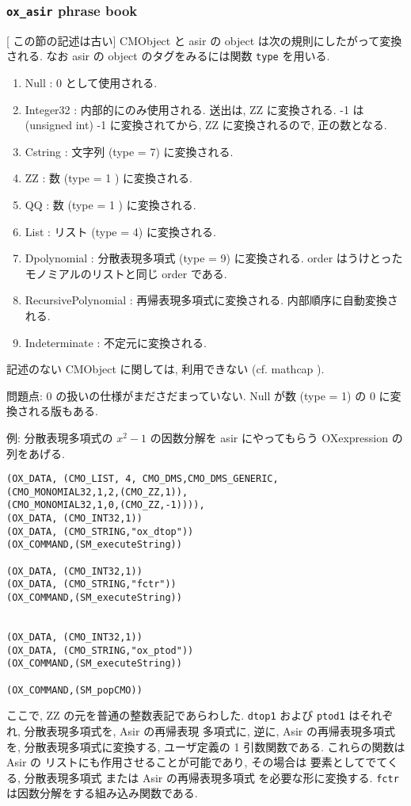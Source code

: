 \subsubsection{ {\tt ox\_asir} phrase book}

[ この節の記述は古い]
CMObject と asir の object は次の規則にしたがって変換される.
なお asir の object のタグをみるには関数 {\tt type} を用いる.
\begin{enumerate}
\item Null :  0 として使用される.
\item Integer32 : 内部的にのみ使用される. 送出は, ZZ に変換される.
  -1 は (unsigned int) -1 に変換されてから, ZZ に変換されるので,
  正の数となる.
\item Cstring : 文字列 (type = 7) に変換される.
\item ZZ : 数 (type = 1 ) に変換される.
\item QQ : 数 (type = 1 ) に変換される.
\item List : リスト (type = 4) に変換される.
\item Dpolynomial : 分散表現多項式 (type = 9) に変換される.
order はうけとったモノミアルのリストと同じ order である.
\item RecursivePolynomial : 再帰表現多項式に変換される.
内部順序に自動変換される.
\item Indeterminate : 不定元に変換される.
\end{enumerate}
記述のない CMObject に関しては, 利用できない (cf. mathcap ).

\noindent
問題点: 0 の扱いの仕様がまださだまっていない.
Null が数 (type = 1) の 0 に変換される版もある.

\medbreak
\noindent
例: 
分散表現多項式の $x^2-1$ の因数分解を asir にやってもらう 
OXexpression の列をあげる.
{\footnotesize
\begin{verbatim}
(OX_DATA, (CMO_LIST, 4, CMO_DMS,CMO_DMS_GENERIC,
(CMO_MONOMIAL32,1,2,(CMO_ZZ,1)),
(CMO_MONOMIAL32,1,0,(CMO_ZZ,-1)))),
(OX_DATA, (CMO_INT32,1))
(OX_DATA, (CMO_STRING,"ox_dtop"))
(OX_COMMAND,(SM_executeString))

(OX_DATA, (CMO_INT32,1))
(OX_DATA, (CMO_STRING,"fctr"))
(OX_COMMAND,(SM_executeString))


(OX_DATA, (CMO_INT32,1))
(OX_DATA, (CMO_STRING,"ox_ptod"))
(OX_COMMAND,(SM_executeString))

(OX_COMMAND,(SM_popCMO))
\end{verbatim}}

ここで, ZZ の元を普通の整数表記であらわした.
{\tt dtop1} および {\tt ptod1} はそれぞれ, 分散表現多項式を, Asir の再帰表現
多項式に, 逆に, Asir の再帰表現多項式を, 分散表現多項式に変換する,
ユーザ定義の 1 引数関数である. %
これらの関数は Asir の リストにも作用させることが可能であり, その場合は
要素としてでてくる,  分散表現多項式 または Asir の再帰表現多項式
を必要な形に変換する.
{\tt fctr} は因数分解をする組み込み関数である.


